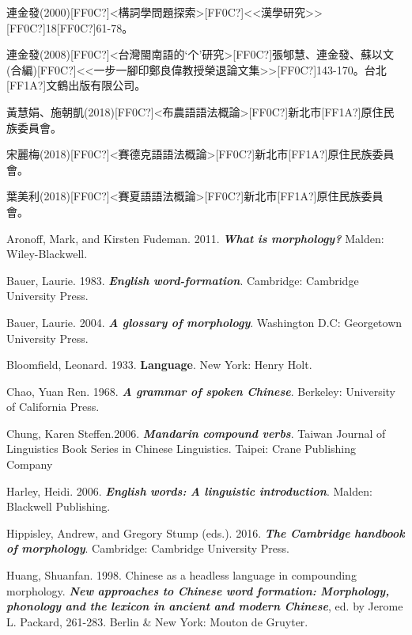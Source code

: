 \rmfamily
連金發(2000)[FF0C?]<構詞學問題探索>[FF0C?]<<漢學研究>>[FF0C?]18[FF0C?]61-78。

\textrm{連金發(2008)[FF0C?]<台灣閩南語的‘个’研究>[FF0C?]張郇慧、連金發、蘇以文 (合編)[FF0C?]<<一步一腳印鄭良偉教授榮退論文集>>[FF0C?]143-170。台北[FF1A?]文鶴出版有限公司。}

\textrm{黃慧娟、施朝凱(2018)[FF0C?]<布農語語法概論>[FF0C?]新北市[FF1A?]原住民族委員會。}

\textrm{宋麗梅(2018)[FF0C?]<賽德克語語法概論>[FF0C?]新北市[FF1A?]原住民族委員會。}

\textrm{葉美利(2018)[FF0C?]<賽夏語語法概論>[FF0C?]新北市[FF1A?]原住民族委員會。}

\textrm{Aronoff, Mark, and Kirsten Fudeman. 2011.} \textrm{\textbf{\textit{What} \textit{is} \textit{morphology?}}} \textrm{Malden: Wiley-Blackwell.}

\textrm{Bauer, Laurie. 1983.} \textrm{\textbf{\textit{English} \textit{word-formation}}}\textrm{. Cambridge: Cambridge University Press.}

\textrm{Bauer, Laurie. 2004.} \textrm{\textbf{\textit{A} \textit{glossary} \textit{of} \textit{morphology}}}\textrm{. }\textrm{Washington D.C: Georgetown University Press.}

\textrm{Bloomfield, Leonard. 1933.}\textrm{\textbf{ \textbf{Language}}}\textrm{.} \textrm{New York: Henry Holt.}

\textrm{Chao, Yuan Ren. 1968.} \textrm{\textbf{\textit{A} \textit{grammar} \textit{of} \textit{spoken} \textit{Chinese}}}\textrm{. Berkeley: University of California Press.} 

\textrm{Chung, Karen Steffen.2006.}\textrm{ }\textrm{\textbf{\textit{Mandarin} \textit{compound} \textit{verbs}}}\textrm{. Taiwan Journal of Linguistics Book Series in Chinese Linguistics. Taipei: Crane Publishing Company}

\textrm{Harley, Heidi. 2006.}\textrm{ }\textrm{\textbf{\textit{English} \textit{words:} \textit{A} \textit{linguistic} \textit{introduction}}}\textrm{.} \textrm{Malden: Blackwell Publishing.}

\textrm{Hippisley, Andrew, and Gregory Stump (eds.). 2016.} \textrm{\textbf{\textit{The} \textit{Cambridge} \textit{handbook} \textit{of} \textit{morphology}}}\textrm{. Cambridge: Cambridge University Press.}

\textrm{Huang, Shuanfan. 1998. Chinese as a headless language in compounding morphology.} \textrm{\textbf{\textit{New} \textit{approaches} \textit{to} \textit{Chinese} \textit{word} \textit{formation:} \textit{Morphology,} \textit{phonology} \textit{and} \textit{the} \textit{lexicon} \textit{in} \textit{ancient} \textit{and} \textit{modern} \textit{Chinese}}}\textrm{, }\textrm{ed. by Jerome L. Packard, 261-283. Berlin \& New York: Mouton de Gruyter.}

